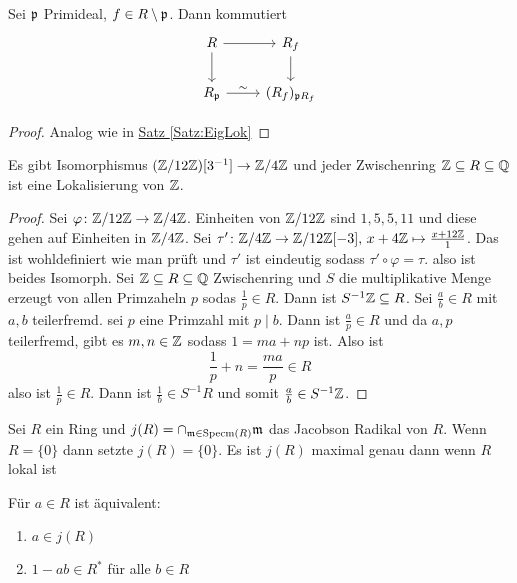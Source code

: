 \begin{Satz}
    Sei \(\mathfrak{p}\) Primideal, \(f\in R\setminus \mathfrak{p}\). 
    Dann kommutiert 
    $$%
\begin{tikzcd}
R \arrow[r] \arrow[d]      & R_f \arrow[d]      \\
R_\frakp \arrow[r, "\sim"] & (R_f)_{\frakp R_f}
\end{tikzcd}$$
\end{Satz}
\begin{proof}
    Analog wie in \hyperref[Satz:EigLok]{Satz \ref{Satz:EigLok}}
\end{proof}
\begin{Bsp}
    Es gibt Isomorphismus \((\mathbb{Z}/12\mathbb{Z})[3^{-1}]\to \mathbb{Z}/4\mathbb{Z}\) und jeder Zwischenring \(\mathbb{Z}\subseteq R\subseteq \mathbb{Q}\) ist eine Lokalisierung von \(\mathbb{Z}\).
\end{Bsp}
\begin{proof}
    Sei \(\varphi\colon \mathbb{Z}/12\mathbb{Z}\to \mathbb{Z}/4\mathbb{Z} \). Einheiten von \(\mathbb{Z}/12\mathbb{Z}\) sind \(1,5,5,11\) und diese gehen auf Einheiten in \(\mathbb{Z}/4\mathbb{Z}\).
    Sei \(\tau'\colon \mathbb{Z}/4\mathbb{Z}\to \mathbb{Z}/12\mathbb{Z}[-3],\, x+4\mathbb{Z}\mapsto \frac{x+12\mathbb{Z}}{1}\). Das ist wohldefiniert wie man prüft und \(\tau'\) ist eindeutig sodass \(\tau'\circ\varphi=\tau.\) also ist beides Isomorph.
    Sei \(\mathbb{Z}\subseteq R\subseteq \mathbb{Q}\) Zwischenring und \(S\) die multiplikative Menge erzeugt von allen Primzaheln \(p\) sodas \(\frac 1 p\in R\). Dann ist \(S^{-1}\mathbb{Z}\subseteq R\). Sei \(\frac a b\in R\) mit \(a,b\) teilerfremd. sei \(p\) eine Primzahl mit \(p\mid b\). Dann ist \(\frac a p\in R\) und da \(a,p\) teilerfremd, gibt es \(m,n\in\mathbb{Z}\) sodass \(1=ma+np\) ist. Also ist \[\frac 1 p+n=\frac{ma}{p}\in R\] also ist \(\frac 1 p\in R\). Dann ist \(\frac 1 b\in S^{-1}R\) und somit \(\frac a b\in S^{-1}\mathbb{Z}\).
\end{proof}
\begin{Def}
    Sei \(R\) ein Ring und \(j(R)=\cap_{\mathfrak{m}\in\operatorname{Specm}(R)}\mathfrak{m}\) das Jacobson Radikal von \(R\). 
    Wenn \(R=\{0\}\) dann setzte \(j(R)=\{0\}\).
    Es ist \(j(R)\) maximal genau dann wenn \(R\) lokal ist
\end{Def}
\begin{Bem}
    Für \(a\in R\) ist äquivalent:
    \begin{enumerate}
        \item \(a\in j(R)\)
        \item \(1-ab\in R^*\) für alle \(b\in R\)
    \end{enumerate}
\end{Bem}
